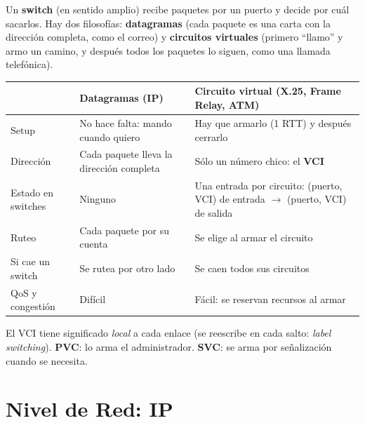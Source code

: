 \documentclass[10pt,a4paper]{article}
\newcommand{\term}[1]{\textbf{\color{azul}#1}}
\begin{document}
\begin{idea}
Un \term{switch} (en sentido amplio) recibe paquetes por un puerto y decide por cuál sacarlos. Hay dos filosofías:
\textbf{datagramas} (cada paquete es una carta con la dirección completa, como el correo) y \textbf{circuitos virtuales}
(primero ``llamo'' y armo un camino, y después todos los paquetes lo siguen, como una llamada telefónica).
\end{idea}
\begin{center}\small
\begin{tabular}{p{3.2cm}p{5.6cm}p{5.6cm}}
\toprule
 & \textbf{Datagramas} (IP) & \textbf{Circuito virtual} (X.25, Frame Relay, ATM) \\
\midrule
Setup & No hace falta: mando cuando quiero & Hay que armarlo (1 RTT) y después cerrarlo \\
Dirección & Cada paquete lleva la dirección completa & Sólo un número chico: el \term{VCI} \\
Estado en switches & Ninguno & Una entrada por circuito: (puerto, VCI) de entrada $\to$ (puerto, VCI) de salida \\
Ruteo & Cada paquete por su cuenta & Se elige al armar el circuito \\
Si cae un switch & Se rutea por otro lado & Se caen todos sus circuitos \\
QoS y congestión & Difícil & Fácil: se reservan recursos al armar \\
\bottomrule
\end{tabular}
\end{center}
El VCI tiene significado \emph{local} a cada enlace (se reescribe en cada salto: \emph{label switching}). \term{PVC}: lo arma el administrador. \term{SVC}: se arma por señalización cuando se necesita.

\section{Nivel de Red: IP}
\end{document}
